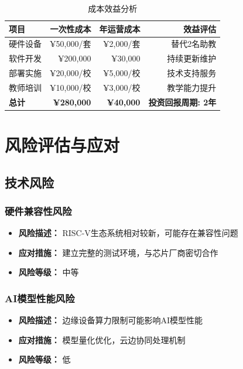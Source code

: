 \documentclass[12pt,a4paper]{article}
\begin{document}
\begin{table}[H]
    \centering
    \caption{成本效益分析}
    \begin{tabular}{|l|r|r|r|}
        \hline
        \textbf{项目} & \textbf{一次性成本} & \textbf{年运营成本} & \textbf{效益评估} \\
        \hline
        硬件设备 & ¥50,000/套 & ¥2,000/套 & 替代2名助教 \\
        \hline
        软件开发 & ¥200,000 & ¥30,000 & 持续更新维护 \\
        \hline
        部署实施 & ¥20,000/校 & ¥5,000/校 & 技术支持服务 \\
        \hline
        教师培训 & ¥10,000/校 & ¥3,000/校 & 教学能力提升 \\
        \hline
        \textbf{总计} & \textbf{¥280,000} & \textbf{¥40,000} & \textbf{投资回报周期: 2年} \\
        \hline
    \end{tabular}
    \label{tab:cost_benefit}
\end{table}

\newpage

\section{风险评估与应对}

\subsection{技术风险}

\subsubsection{硬件兼容性风险}
\begin{itemize}[leftmargin=2em]
    \item \textbf{风险描述：} RISC-V生态系统相对较新，可能存在兼容性问题
    \item \textbf{应对措施：} 建立完整的测试环境，与芯片厂商密切合作
    \item \textbf{风险等级：} 中等
\end{itemize}

\subsubsection{AI模型性能风险}
\begin{itemize}[leftmargin=2em]
    \item \textbf{风险描述：} 边缘设备算力限制可能影响AI模型性能
    \item \textbf{应对措施：} 模型量化优化，云边协同处理机制
    \item \textbf{风险等级：} 低
\end{itemize}
\end{document}

